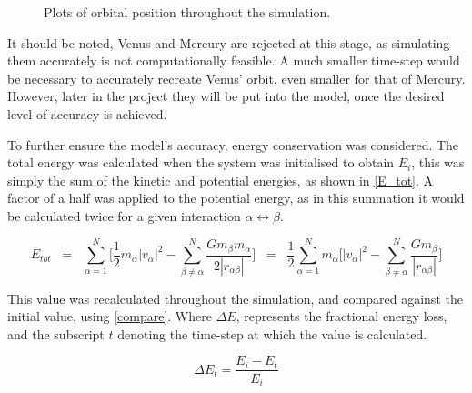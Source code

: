 \documentclass[a4paper,10pt]{article}
\begin{document}
\begin{figure}[h!]
    \centering
    \qquad
    \caption{Plots of orbital position throughout the simulation.}%
    \label{Distance}%
\end{figure}

It should be noted, Venus and Mercury are rejected at this stage, as simulating them accurately is not computationally feasible. A much smaller time-step would be necessary to accurately recreate Venus' orbit, even smaller for that of Mercury. However, later in the project they will be put into the model, once the desired level of accuracy is achieved. \pagebreak

To further ensure the model's accuracy, energy conservation was considered. The total energy was calculated when the system was initialised to obtain $E_i$, this was simply the sum of the kinetic and potential energies, as shown in \cref{E_tot}. A factor of a half was applied to the potential energy, as in this summation it would be calculated twice for a given interaction $\alpha \leftrightarrow \beta$. 

\begin{equation} \label{E_tot}
    E_{tot}  \;\; =  \;\;  \sum\limits_{\alpha=1}^{N} \bigg[ \frac{1}{2}m_{\alpha}\left|v_{\alpha}\right|^2 - \sum\limits_{\beta\neq \alpha}^{N}\frac{G m_\beta m_\alpha}{2 \left|r_{\alpha\beta}\right|}\bigg]  \;\; = \;\; \frac{1}{2} \sum\limits_{\alpha=1}^{N}m_{\alpha} \bigg[\left|v_{\alpha}\right|^2 - \sum\limits_{\beta \neq \alpha}^{N}\frac{G m_\beta}{\left|r_{\alpha \beta}\right|}\bigg] 
 \end{equation}
 
 This value was recalculated throughout the simulation, and compared against the initial value, using \cref{compare}. Where $ \Delta E$, represents the fractional energy loss, and the subscript $t$ denoting the time-step at which the value is calculated.
 
 \begin{equation} \label{compare}
    \Delta E_t =  \frac{E_i - E_t}{E_i}
\end{equation}
\end{document}
